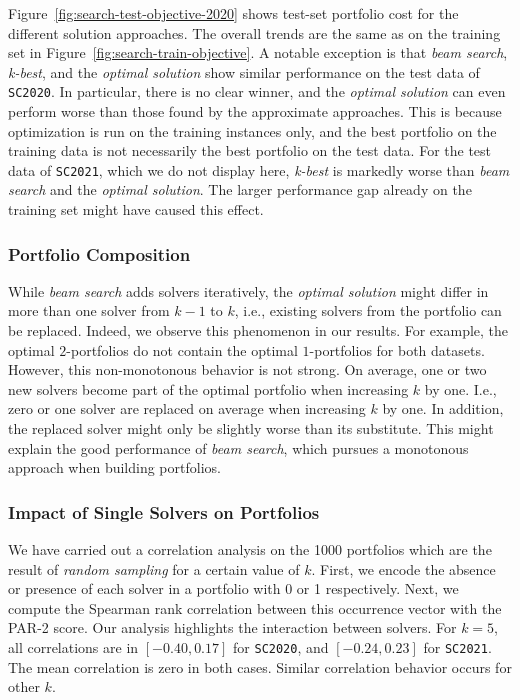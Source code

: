 \documentclass[conference]{IEEEtran}
\begin{document}
Figure~\ref{fig:search-test-objective-2020} shows test-set portfolio cost for the different solution approaches.
The overall trends are the same as on the training set in Figure~\ref{fig:search-train-objective}.
A notable exception is that \emph{beam search}, \emph{k-best}, and the \emph{optimal solution} show similar performance on the test data of \texttt{SC2020}.
In particular, there is no clear winner, and the \emph{optimal solution} can even perform worse than those found by the approximate approaches. 
This is because optimization is run on the training instances only, and the best portfolio on the training data is not necessarily the best portfolio on the test data.
For the test data of \texttt{SC2021}, which we do not display here, \emph{k-best} is markedly worse than \emph{beam search} and the \emph{optimal solution}. 
The larger performance gap already on the training set might have caused this effect.

\subsubsection{Portfolio Composition}

While \emph{beam search} adds solvers iteratively, the \emph{optimal solution} might differ in more than one solver from $k-1$ to $k$, i.e., existing solvers from the portfolio can be replaced.
Indeed, we observe this phenomenon in our results.
For example, the optimal $2$-portfolios do not contain the optimal $1$-portfolios for both datasets.
However, this non-monotonous behavior is not strong.
On average, one or two new solvers become part of the optimal portfolio when increasing $k$ by one.
I.e., zero or one solver are replaced on average when increasing $k$ by one.
In addition, the replaced solver might only be slightly worse than its substitute.
This might explain the good performance of \emph{beam search}, which pursues a monotonous approach when building portfolios.

\subsubsection{Impact of Single Solvers on Portfolios}

We have carried out a correlation analysis on the 1000 portfolios which are the result of \emph{random sampling} for a certain value of $k$. 
First, we encode the absence or presence of each solver in a portfolio with 0 or 1 respectively.
Next, we compute the Spearman rank correlation between this occurrence vector with the PAR-2 score.
Our analysis highlights the interaction between solvers. 
For $k=5$, all correlations are in $[-0.40,0.17]$ for \texttt{SC2020}, and $[-0.24,0.23]$ for \texttt{SC2021}.
The mean correlation is zero in both cases.
Similar correlation behavior occurs for other $k$.
\end{document}
